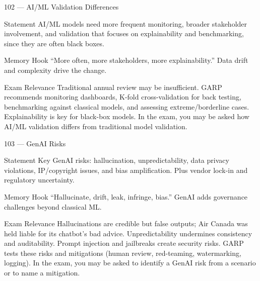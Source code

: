 \documentclass[aspectratio=169,8pt]{beamer}
\begin{document}
	\begin{frame}{102 --- AI/ML Validation Differences}
		\begin{block}{Statement}
			AI/ML models need more frequent monitoring, broader stakeholder involvement, and validation that focuses on explainability and benchmarking, since they are often black boxes.
		\end{block}
		\begin{block}{Memory Hook}
			``More often, more stakeholders, more explainability.'' Data drift and complexity drive the change.
		\end{block}
		\begin{block}{Exam Relevance}
			Traditional annual review may be insufficient. GARP recommends monitoring dashboards, K-fold cross-validation for back testing, benchmarking against classical models, and assessing extreme/borderline cases. Explainability is key for black-box models. In the exam, you may be asked how AI/ML validation differs from traditional model validation.
		\end{block}
	\end{frame}
	
	\begin{frame}{103 --- GenAI Risks}
		\begin{block}{Statement}
			Key GenAI risks: hallucination, unpredictability, data privacy violations, IP/copyright issues, and bias amplification. Plus vendor lock-in and regulatory uncertainty.
		\end{block}
		\begin{block}{Memory Hook}
			``Hallucinate, drift, leak, infringe, bias.'' GenAI adds governance challenges beyond classical ML.
		\end{block}
		\begin{block}{Exam Relevance}
			Hallucinations are credible but false outputs; Air Canada was held liable for its chatbot's bad advice. Unpredictability undermines consistency and auditability. Prompt injection and jailbreaks create security risks. GARP tests these risks and mitigations (human review, red-teaming, watermarking, logging). In the exam, you may be asked to identify a GenAI risk from a scenario or to name a mitigation.
		\end{block}
	\end{frame}
	
\end{document}
